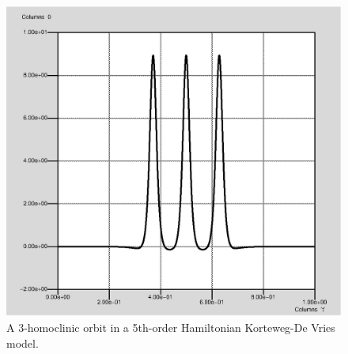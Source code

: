 \documentclass[12pt]{report}
\begin{document}
\begin{figure}[htb]
\begin{center}
\includegraphics[scale=0.5]{include/kdv3hom.eps}
\caption{A 3-homoclinic orbit in a 5th-order Hamiltonian 
Korteweg-De Vries model.}
\label{kdv3hom}
\end{center}
\end{figure}



 \label{sec:bibliography}
\end{document}
